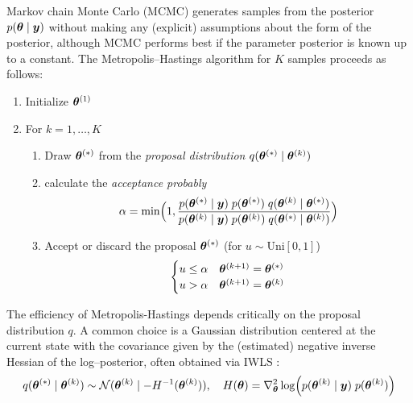 Markov chain Monte Carlo (MCMC) generates samples from the posterior $p(\bm{\theta}\mid \bm{y})$ without making any (explicit) assumptions about the form of the posterior, although MCMC performs best if the parameter posterior is known up to a constant.
The Metropolis–Hastings algorithm \citep{hastings_monte_1970} for $K$ samples\footnotemark \; proceeds as follows:
\begin{enumerate}
    \item Initialize $\bm{\theta}^{(1)}$
    \item For $k = 1, \dots, K$
    \begin{enumerate}
        \item Draw $\bm{\theta}^{(*)}$ from the \textit{proposal distribution} $q(\bm{\theta}^{(*)} \mid \bm{\theta}^{(k)})$
        \item calculate the \textit{acceptance probably} 
            \begin{equation*}
                \alpha = \min \Bigl(
                    1, \frac{
                        p(\bm{\theta}^{(*)} \mid \bm{y})\; p(\bm{\theta}^{(*)}) \; q(\bm{\theta}^{(k)} \mid \bm{\theta}^{(*)})}{
                            p(\bm{\theta}^{(k)} \mid \bm{y})\; p(\bm{\theta}^{(k)}) \; q(\bm{\theta}^{(*)} \mid \bm{\theta}^{(k)})
                        }
                    \Bigr)
            \end{equation*}
        \item Accept or discard the proposal $\bm{\theta}^{(*)}$ (for $u \sim \text{Uni}[0, 1]$)
            \begin{equation*}
                \begin{cases}
                    u \le \alpha & \bm{\theta}^{(k+1)} = \bm{\theta}^{(*)}\\
                    u > \alpha & \bm{\theta}^{(k+1)} = \bm{\theta}^{(k)}\\
                \end{cases}
            \end{equation*}
    \end{enumerate}
\end{enumerate}

The efficiency of Metropolis-Hastings depends critically on the proposal distribution $q$.
A common choice is a Gaussian distribution centered at the current state with the covariance given by the (estimated) negative inverse Hessian of the log–posterior, often obtained via IWLS \citep{gamerman_markov_1998,lenk_bayesian_2000,scott_data_2011}:\footnotemark
\begin{equation*}
    q(\bm{\theta}^{(*)} \mid \bm{\theta}^{(k)}) \sim \mathcal{N}(\bm{\theta}^{(k)} \mid -H^{-1}(\bm{\theta}^{(k)})), \quad H(\bm{\theta}) = \nabla_{\bm{\theta}}^2  \log \Bigl(p(\bm{\theta}^{(k)} \mid \bm{y})\; p(\bm{\theta}^{(k)})\Bigr)
\end{equation*}

